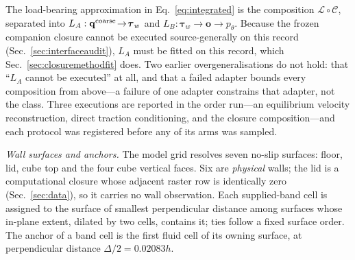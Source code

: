 The load-bearing approximation in Eq.~\eqref{eq:integrated} is the composition
$\mathcal L\circ\mathcal C$, separated into
$L_A:\mathbf q^{\rm coarse}\!\to\!\boldsymbol\tau_w$ and
$L_B:\boldsymbol\tau_w\!\to\!\mathbf o\!\to\!p_\theta$. Because the frozen companion closure
cannot be executed source-generally on this record (Sec.~\ref{sec:interfaceaudit}), $L_A$ must be
fitted on this record, which Sec.~\ref{sec:closuremethodfit} does. Two earlier
overgeneralisations do not hold: that ``$L_A$ cannot be executed'' at all, and that a failed
adapter bounds every composition from above---a failure of one adapter constrains that adapter,
not the class. Three executions are reported in
the order run---an equilibrium velocity reconstruction, direct traction conditioning, and the
closure composition---and each protocol was registered before any of its arms was sampled.

\emph{Wall surfaces and anchors.} The model grid resolves seven no-slip surfaces: floor, lid,
cube top and the four cube vertical faces. Six are \emph{physical} walls; the lid is a
computational closure whose adjacent raster row is identically zero (Sec.~\ref{sec:data}), so it
carries no wall observation. Each supplied-band cell is assigned to the surface of smallest
perpendicular distance among surfaces whose in-plane extent, dilated by two cells, contains it;
ties follow a fixed surface order. The anchor of a band cell is the first fluid cell of its owning
surface, at perpendicular distance $\Delta/2=0.02083h$.

